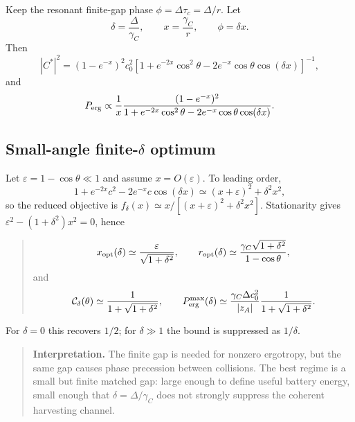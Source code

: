 \documentclass[11pt,a4paper]{article}
\newcommand{\eps}{\varepsilon}
\newenvironment{resultbox}{\begin{quote}\small\color{blue!40!black}}{\end{quote}}
\newenvironment{notebox}{\begin{quote}\small}{\end{quote}}
\begin{document}
Keep the resonant finite-gap phase $\phi=\Delta\tau_c=\Delta/r$. Let
\begin{equation}
\delta=\frac{\Delta}{\gamma_C},
\qquad
x=\frac{\gamma_C}{r},
\qquad
\phi=\delta x.
\end{equation}
Then
\begin{equation}
|C^*|^2=(1-e^{-x})^2c_0^2
\left[1+e^{-2x}\cos^2\theta-2e^{-x}\cos\theta\cos(\delta x)\right]^{-1},
\end{equation}
and
\begin{equation}
P_{\rm erg}\propto \frac1x
\frac{(1-e^{-x})^2}{1+e^{-2x}\cos^2\theta-2e^{-x}\cos\theta\cos(\delta x)}.
\end{equation}

\subsection{Small-angle finite-$\delta$ optimum}

Let $\eps=1-\cos\theta\ll1$ and assume $x=O(\eps)$. To leading order,
\begin{equation}
1+e^{-2x}c^2-2e^{-x}c\cos(\delta x)
\simeq (x+\eps)^2+\delta^2x^2,
\end{equation}
so the reduced objective is $f_\delta(x)\simeq x/[(x+\eps)^2+\delta^2x^2]$. Stationarity gives $\eps^2-(1+\delta^2)x^2=0$, hence
\begin{resultbox}
\begin{equation}
x_{\rm opt}(\delta)\simeq\frac{\eps}{\sqrt{1+\delta^2}},
\qquad
r_{\rm opt}(\delta)\simeq\frac{\gamma_C\sqrt{1+\delta^2}}{1-\cos\theta},
\end{equation}
and
\begin{equation}
\mathcal C_\delta(\theta)\simeq\frac{1}{1+\sqrt{1+\delta^2}},
\qquad
P_{\rm erg}^{\rm max}(\delta)
\simeq
\frac{\gamma_C\Delta c_0^2}{|z_A|}\frac{1}{1+\sqrt{1+\delta^2}}.
\end{equation}
\end{resultbox}
For $\delta=0$ this recovers $1/2$; for $\delta\gg1$ the bound is suppressed as $1/\delta$.

\begin{notebox}
\textbf{Interpretation.} The finite gap is needed for nonzero ergotropy, but the same gap causes phase precession between collisions. The best regime is a small but finite matched gap: large enough to define useful battery energy, small enough that $\delta=\Delta/\gamma_C$ does not strongly suppress the coherent harvesting channel.
\end{notebox}
\end{document}
